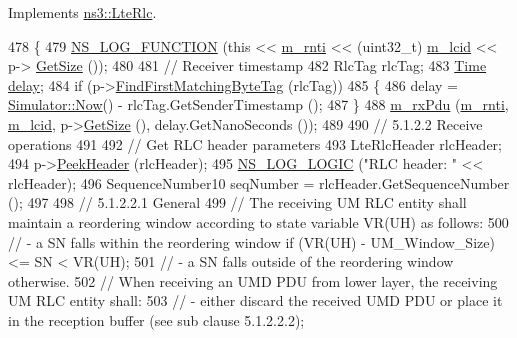 Implements \hyperlink{classns3_1_1LteRlc_af2e315f4fe83d8d8f970832055a784d3}{ns3\+::\+Lte\+Rlc}.


\begin{DoxyCode}
478 \{
479   \hyperlink{log-macros-disabled_8h_a90b90d5bad1f39cb1b64923ea94c0761}{NS\_LOG\_FUNCTION} (\textcolor{keyword}{this} << \hyperlink{classns3_1_1LteRlc_a48ab0a78e7f2687337075b1c8832df70}{m\_rnti} << (uint32\_t) \hyperlink{classns3_1_1LteRlc_a051085e9b27883e7ba4b98ad7242fd8a}{m\_lcid} << p->
      \hyperlink{classns3_1_1Packet_a462855c9929954d4301a4edfe55f4f1c}{GetSize} ());
480 
481   \textcolor{comment}{// Receiver timestamp}
482   RlcTag rlcTag;
483   \hyperlink{namespacens3_1_1TracedValueCallback_a7ffd3e7c142ffe7c8a1d2db9b8de38ec}{Time} \hyperlink{lte_2model_2fading-traces_2fading__trace__generator_8m_a7964e6aa8f61a9d28973c8267a606ad8}{delay};
484   \textcolor{keywordflow}{if} (p->\hyperlink{classns3_1_1Packet_a2e1403c2411495827012fe000823c16a}{FindFirstMatchingByteTag} (rlcTag))
485     \{
486       delay = \hyperlink{classns3_1_1Simulator_ac3178fa975b419f7875e7105be122800}{Simulator::Now}() - rlcTag.GetSenderTimestamp ();
487     \}
488   \hyperlink{classns3_1_1LteRlc_a5a2491726597ab3cb02655b34dca0722}{m\_rxPdu} (\hyperlink{classns3_1_1LteRlc_a48ab0a78e7f2687337075b1c8832df70}{m\_rnti}, \hyperlink{classns3_1_1LteRlc_a051085e9b27883e7ba4b98ad7242fd8a}{m\_lcid}, p->\hyperlink{classns3_1_1Packet_a462855c9929954d4301a4edfe55f4f1c}{GetSize} (), delay.GetNanoSeconds ());
489 
490   \textcolor{comment}{// 5.1.2.2 Receive operations}
491 
492   \textcolor{comment}{// Get RLC header parameters}
493   LteRlcHeader rlcHeader;
494   p->\hyperlink{classns3_1_1Packet_aadc63487bea70945c418f4c3e9b81964}{PeekHeader} (rlcHeader);
495   \hyperlink{group__logging_ga88acd260151caf2db9c0fc84997f45ce}{NS\_LOG\_LOGIC} (\textcolor{stringliteral}{"RLC header: "} << rlcHeader);
496   SequenceNumber10 seqNumber = rlcHeader.GetSequenceNumber ();
497 
498   \textcolor{comment}{// 5.1.2.2.1 General}
499   \textcolor{comment}{// The receiving UM RLC entity shall maintain a reordering window according to state variable VR(UH) as
       follows:}
500   \textcolor{comment}{// - a SN falls within the reordering window if (VR(UH) - UM\_Window\_Size) <= SN < VR(UH);}
501   \textcolor{comment}{// - a SN falls outside of the reordering window otherwise.}
502   \textcolor{comment}{// When receiving an UMD PDU from lower layer, the receiving UM RLC entity shall:}
503   \textcolor{comment}{// - either discard the received UMD PDU or place it in the reception buffer (see sub clause 5.1.2.2.2);}

\end{DoxyCode}

